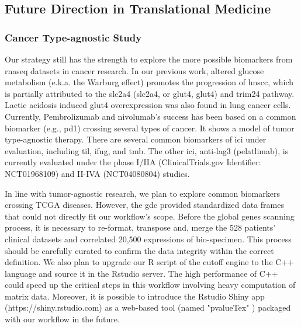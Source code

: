 \documentclass[jpm,article,submit,moreauthors,pdftex]{Definitions/mdpi}
\begin{document}
\begin{paracol}{2}
\subsection{Future Direction in Translational Medicine}

\subsubsection{Cancer Type-agnostic Study}
Our strategy still has the strength to explore the more possible biomarkers from \acrshort{rnaseq} datasets in cancer research.
In our previous work, altered glucose metabolism (e.k.a. the Warburg effect\cite{Warburg1956}) promotes the progression of \acrshort{hnscc}, which is partially attributed to the \acrlong{slc2a4} (\acrshort{slc2a4}, or \acrlong{glut4}, \acrshort{glut4}) and \acrfull{trim24} pathway\cite{Chang2017b}\cite{Mani2020}.
Lactic acidosis induced \acrshort{glut4} overexpression was also found in lung cancer cells\cite{Prado-Garcia2020}. 
Currently, Pembrolizumab and nivolumab's success has been based on a common biomarker (e.g., \acrshort{pd1}) crossing several types of cancer.
It shows a model of tumor type-agnostic therapy\cite{Yan2018}.
There are several common biomarkers of \acrfull{ici} under evaluation, including \acrfull{til}, \acrfull{ifng}, and \acrfull{tmb}\cite{Gavrielatou2020}.
The other \acrshort{ici}, anti-\acrshort{lag3} (pelatlimab), is currently evaluated under the phase I/IIA\cite{Cristina2019} (ClinicalTrials.gov Identifier: NCT01968109) and II-IVA\cite{Neal2019} (NCT04080804) studies.

In line with tumor-agnostic research, we plan to explore common biomarkers crossing TCGA diseases. However, the \acrshort{gdc} provided standardized data frames that could not directly fit our workflow's scope. Before the global genes scanning process, it is necessary to re-format, transpose and, merge the 528 patients' clinical datasets and correlated 20,500 expressions of bio-specimen. This process should be carefully curated to confirm the data integrity within the correct definition\cite{Rendleman2019}. We also plan to upgrade our R script of the cutoff engine to the C++ language and source it in the Rstudio server. The high performance of C++ could speed up the critical steps in this workflow involving heavy computation of matrix data\cite{Woodward2020}. Moreover, it is possible to introduce the Rstudio Shiny app (https://shiny.rstudio.com) as a web-based tool (named "pvalueTex" ) packaged with our workflow in the future.





\end{paracol}
\end{document}
